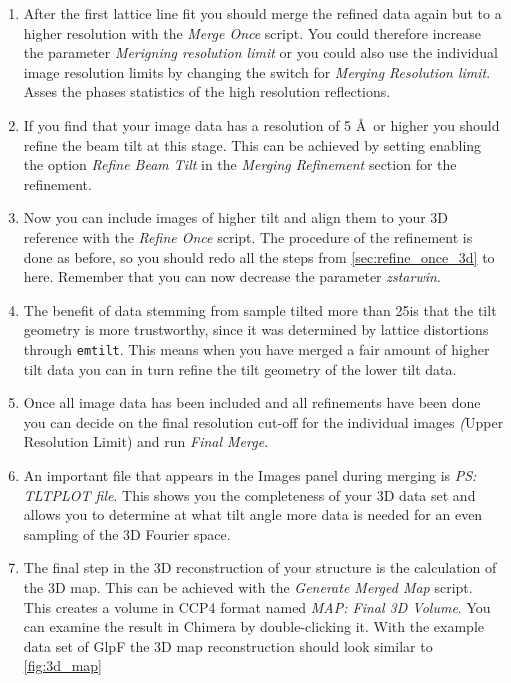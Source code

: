 \begin{enumerate}
	\item After the first lattice line fit you should merge the refined data again but to a higher resolution with the \textit{Merge Once} script. You could therefore increase the parameter \textit{Merigning resolution limit} or you could also use the individual image resolution limits by changing the switch for \textit{Merging Resolution limit}. Asses the phases statistics of the high resolution reflections.
	\item If you find that your image data has a resolution of 5 \AA~or higher you should refine the beam tilt at this stage. This can be achieved by setting enabling the option \textit{Refine Beam Tilt} in the \textit{Merging Refinement} section for the refinement.
	\item Now you can include images of higher tilt and align them to your 3D reference with the \textit{Refine Once} script. The procedure of the refinement is done as before, so you should redo all the steps from \autoref{sec:refine_once_3d} to here. Remember that you can now decrease the parameter \textit{zstarwin}.
	\item The benefit of data stemming from sample tilted more than 25\textdegree  is that the tilt geometry is more trustworthy, since it was determined by lattice distortions through \texttt{emtilt}. This means when you have merged a fair amount of  higher tilt data you can in turn refine the tilt geometry of the lower tilt data.
	\item Once all image data has been included and all refinements have been done you can decide on the final resolution cut-off for the individual images \textit(Upper Resolution Limit) and run \textit{Final Merge}.
	\item An important file that appears in the Images panel during merging is \textit{PS: TLTPLOT file}. This shows you the completeness of your 3D data set and allows you to determine at what tilt angle more data is needed for an even sampling of the 3D Fourier space.
	\item The final step in the 3D reconstruction of your structure is the calculation of the 3D map. This can be achieved with the \textit{Generate Merged Map} script. This creates a volume in CCP4 format named \textit{MAP: Final 3D Volume}. You can examine the result in Chimera by double-clicking it. With the example data set of GlpF the 3D map reconstruction should look similar to \autoref{fig:3d_map}
	

\end{enumerate}
